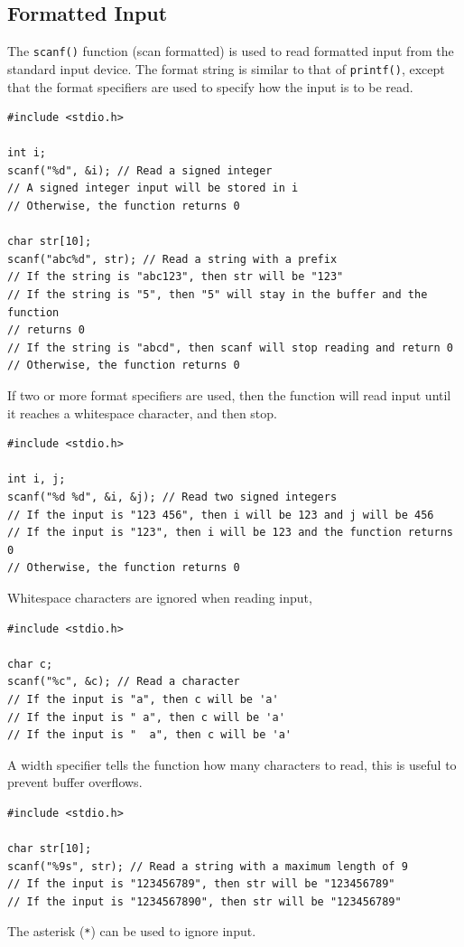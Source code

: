 \documentclass{report}
\begin{document}
\subsection{Formatted Input}
The \texttt{scanf()} function (scan formatted) is used to read formatted input from the standard input device. The format string is similar to that of \texttt{printf()},
except that the format specifiers are used to specify how the input is to be read.
\begin{verbatim}
#include <stdio.h>

int i;
scanf("%d", &i); // Read a signed integer
// A signed integer input will be stored in i
// Otherwise, the function returns 0

char str[10];
scanf("abc%d", str); // Read a string with a prefix
// If the string is "abc123", then str will be "123"
// If the string is "5", then "5" will stay in the buffer and the function
// returns 0
// If the string is "abcd", then scanf will stop reading and return 0
// Otherwise, the function returns 0
\end{verbatim}
If two or more format specifiers are used, then the function will read input until it reaches a whitespace character, and then stop.
\begin{verbatim}
#include <stdio.h>

int i, j;
scanf("%d %d", &i, &j); // Read two signed integers
// If the input is "123 456", then i will be 123 and j will be 456
// If the input is "123", then i will be 123 and the function returns 0
// Otherwise, the function returns 0
\end{verbatim}
Whitespace characters are ignored when reading input,
\begin{verbatim}
#include <stdio.h>

char c;
scanf("%c", &c); // Read a character
// If the input is "a", then c will be 'a'
// If the input is " a", then c will be 'a'
// If the input is "  a", then c will be 'a'
\end{verbatim}
A width specifier tells the function how many characters to read, this is useful to prevent buffer overflows.
\begin{verbatim}
#include <stdio.h>

char str[10];
scanf("%9s", str); // Read a string with a maximum length of 9
// If the input is "123456789", then str will be "123456789"
// If the input is "1234567890", then str will be "123456789"
\end{verbatim}
The asterisk (\texttt{*}) can be used to ignore input.
\end{document}
